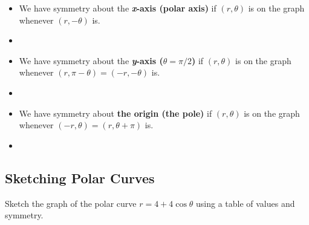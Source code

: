 \documentclass[12pt]{article}
\begin{document}
\begin{minipage}{0.68\linewidth}
\begin{itemize}
	\item We have symmetry about the \textbf{\textit{x}-axis (polar axis)} if $(r,\theta)$ is on the graph whenever $(r,-\theta)$ is.
	\item[]
	\item We have symmetry about the \textbf{\textit{y}-axis ($\theta=\pi/2$)} if $(r,\theta)$ is on the graph whenever $(r,\pi-\theta)=(-r,-\theta)$ is.
	\item[]
	\item We have symmetry about \textbf{the origin (the pole)} if $(r,\theta)$ is on the graph whenever $(-r,\theta)=(r,\theta+\pi)$ is.
	\item[]
 
\end{itemize}
\end{minipage}




\subsection*{Sketching Polar Curves}

\Example Sketch the graph of the polar curve $r=4+4\cos\theta$ using a table of values and symmetry.
\end{document}
